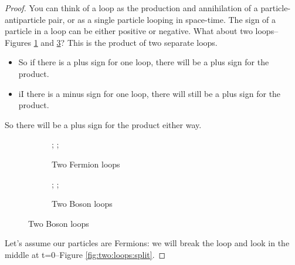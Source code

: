 \documentclass[]{article}
\begin{document}
\begin{proof}
	You can think of a loop as the production and annihilation of a particle-antiparticle pair, or as a single particle looping in space-time. The sign of a particle in a loop can be either positive or negative. What about two loops--Figures \ref{fig:two:loops:fermion} and \ref{fig:two:loops:boson}? This is the product of two separate loops. \begin{itemize}
		\item So if there is a plus sign for one loop, there will be a plus sign for the product.
		\item iI there is a minus sign for one loop, there will still be a plus sign for the product.
	\end{itemize} So there will  be a plus sign for the product either way.
	
	\begin{figure}[H]
		\caption{Two loops: each is a product of two separate loops.}\label{fig:two:loops}
		\begin{subfigure}[t]{0.45\textwidth}
			\begin{center}
				\caption{Two Fermion loops}\label{fig:two:loops:fermion}
				;
				;
			\end{center}
		\end{subfigure}
		\hfill
		\begin{subfigure}[t]{0.45\textwidth}
			\begin{center}
				\caption{Two Boson loops}\label{fig:two:loops:boson}
				;
				;
			\end{center}
		\end{subfigure}

	\end{figure}
	
	Let's assume our particles are Fermions: we will break the loop and look in the middle at t=0--Figure \ref{fig:two:loops:split}. 
		

\end{proof}
\end{document}

